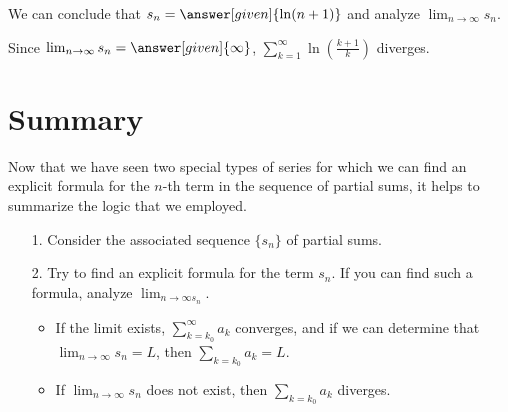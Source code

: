 \documentclass{ximera}
\begin{document}
\begin{example}
\begin{explanation}
  


We can conclude that $s_n =\answer[given]{\ln (n+1)}$ and analyze $\lim_{n \to \infty} s_n$.  

Since $\lim_{n\to\infty}s_n=\answer[given]{\infty}$, $\sum_{k=1}^\infty \ln\left(\frac{k+1}{k}\right)$ diverges.
\end{explanation}
\end{example}


\section{Summary}
Now that we have seen two special types of series for which we can find an explicit formula for the $n$-th term in the sequence of partial sums, it helps to summarize the logic that we employed.

\begin{itemize}
\item[1.] Consider the associated sequence $\{s_n\}$ of partial sums.
\item[2.] Try to find an explicit formula for the term $s_n$.  If you can find such a formula, analyze $\lim_{n \to \infty s_n}$.  
\begin{itemize}
\item If the limit exists, $\sum_{k=k_0}^{\infty} a_k$ converges, and if we can determine that $\lim_{n \to \infty} s_n =L$, then $\sum_{k=k_0} a_k=L$.  \item If  $\lim_{n \to \infty} s_n$ does not exist, then $\sum_{k=k_0} a_k$ diverges.
\end{itemize}
\end{itemize}
\end{document}
